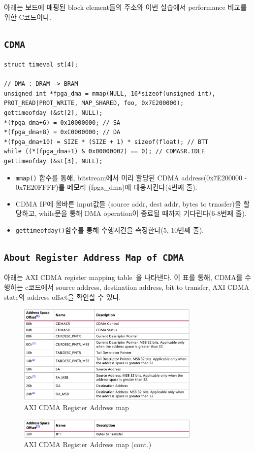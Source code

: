 \documentclass{article}
\begin{document}
아래는 보드에 매핑된 block element들의 주소와 이번 실습에서 performance 비교를 위한 C코드이다.
\subsection*{\texttt{CDMA}}
\begin{lstlisting}[style={c-style}]
struct timeval st[4];

// DMA : DRAM -> BRAM
unsigned int *fpga_dma = mmap(NULL, 16*sizeof(unsigned int), PROT_READ|PROT_WRITE, MAP_SHARED, foo, 0x7E200000);
gettimeofday (&st[2], NULL);
*(fpga_dma+6) = 0x10000000; // SA
*(fpga_dma+8) = 0xC0000000; // DA
*(fpga_dma+10) = SIZE * (SIZE + 1) * sizeof(float); // BTT
while ((*(fpga_dma+1) & 0x00000002) == 0); // CDMASR.IDLE
gettimeofday (&st[3], NULL);
\end{lstlisting}
\begin{itemize}
    \item  \texttt{mmap()} 함수를 통해, bitstream에서 미리 할당된 CDMA address(0x7E200000 - 0x7E20FFFF)를 메모리 (fpga\_dma)에 대응시킨다(4번째 줄).
    \item CDMA IP에 올바른 input값들 (source addr, dest addr, bytes to trnasfer)을 할당하고, while문을 통해 DMA operation이 종료될 때까지 기다린다(6-8번째 줄).
    \item \texttt{gettimeofday()}함수를 통해 수행시간을 측정한다(5, 10번째 줄).
\end{itemize}

\subsection*{\texttt{About Register Address Map of CDMA}}
아래는 AXI CDMA register mapping table~\cite{CDMA}을 나타낸다. 이 표를 통해, CDMA를 수행하는 c코드에서 source address, destination address, bit to transfer, AXI CDMA state의 address offset을 확인할 수 있다.
\begin{figure}[htb!]
	\centering
	\includegraphics[width=0.8\textwidth]{fig/cmda_addrmap_1.png}
\caption{AXI CDMA Register Address map}
\label{fig4}
\end{figure}
\begin{figure}[htb!]
	\centering
	\includegraphics[width=0.8\textwidth]{fig/cdma_addrmap_2.png}
\caption{AXI CDMA Register Address map (cont.)}
\label{fig5}
\end{figure}
\end{document}
